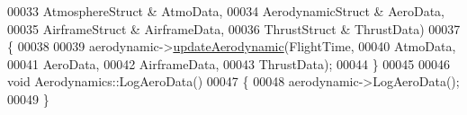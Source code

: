 \begin{DoxyCode}
00033                                     AtmosphereStruct & AtmoData, 
00034                                     AerodynamicStruct & AeroData, 
00035                                     AirframeStruct & AirframeData, 
00036                                     ThrustStruct & ThrustData)
00037 \{
00038 
00039     aerodynamic->\hyperlink{group___aerodynamic_a6354f3c8433c7a2235041f843d4fe10e}{updateAerodynamic}(FlightTime,
00040                                     AtmoData,
00041                                     AeroData,
00042                                     AirframeData,
00043                                     ThrustData);
00044 \}
00045 
00046 \textcolor{keywordtype}{void} Aerodynamics::LogAeroData()
00047 \{
00048     aerodynamic->LogAeroData();
00049 \}
\end{DoxyCode}
